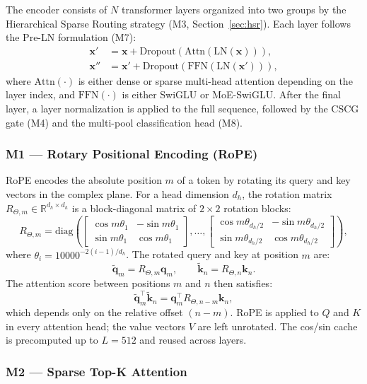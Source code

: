 \documentclass[conference]{IEEEtran}
\begin{document}
The encoder consists of $N$ transformer layers organized into two groups by the Hierarchical Sparse Routing strategy (M3, Section~\ref{sec:hsr}). Each layer follows the Pre-LN formulation (M7):
\begin{align}
\mathbf{x}' &= \mathbf{x} + \text{Dropout}(\text{Attn}(\text{LN}(\mathbf{x}))), \\
\mathbf{x}'' &= \mathbf{x}' + \text{Dropout}(\text{FFN}(\text{LN}(\mathbf{x}'))),
\end{align}
where $\text{Attn}(\cdot)$ is either dense or sparse multi-head attention depending on the layer index, and $\text{FFN}(\cdot)$ is either SwiGLU or MoE-SwiGLU. After the final layer, a layer normalization is applied to the full sequence, followed by the CSCG gate (M4) and the multi-pool classification head (M8).

\subsubsection{M1 — Rotary Positional Encoding (RoPE)}
\label{sec:rope}

RoPE \cite{su2021rope} encodes the absolute position $m$ of a token by rotating its query and key vectors in the complex plane. For a head dimension $d_h$, the rotation matrix $R_{\Theta,m} \in \mathbb{R}^{d_h \times d_h}$ is a block-diagonal matrix of $2 \times 2$ rotation blocks:
\[
R_{\Theta,m} = \text{diag}\!\left(
\begin{bmatrix}\cos m\theta_1 & -\sin m\theta_1 \\ \sin m\theta_1 & \cos m\theta_1\end{bmatrix},
\dots,
\begin{bmatrix}\cos m\theta_{d_h/2} & -\sin m\theta_{d_h/2} \\ \sin m\theta_{d_h/2} & \cos m\theta_{d_h/2}\end{bmatrix}
\right),
\]
where $\theta_i = 10000^{-2(i-1)/d_h}$. The rotated query and key at position $m$ are:
\[
\tilde{\mathbf{q}}_m = R_{\Theta,m}\mathbf{q}_m, \qquad \tilde{\mathbf{k}}_n = R_{\Theta,n}\mathbf{k}_n.
\]
The attention score between positions $m$ and $n$ then satisfies:
\[
\tilde{\mathbf{q}}_m^\top \tilde{\mathbf{k}}_n = \mathbf{q}_m^\top R_{\Theta,n-m} \mathbf{k}_n,
\]
which depends only on the relative offset $(n - m)$. RoPE is applied to $Q$ and $K$ in every attention head; the value vectors $V$ are left unrotated. The cos/sin cache is precomputed up to $L = 512$ and reused across layers.

\subsubsection{M2 — Sparse Top-K Attention}
\end{document}
